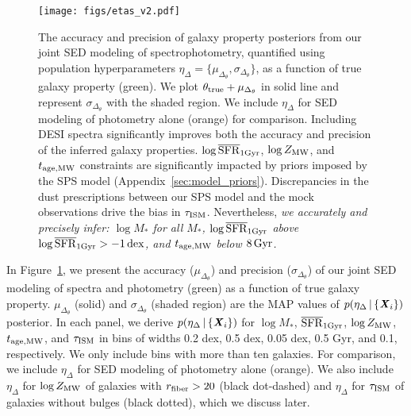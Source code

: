 \begin{figure}
\begin{center}
    \texttt{[image: figs/etas\_v2.pdf]}
    \caption{
        The accuracy and precision of galaxy property posteriors from our
        joint SED modeling of spectrophotometry, quantified using population
        hyperparameters $\eta_\Delta = \{\mu_{\Delta_{\theta}},
        \sigma_{\Delta_{\theta}}\}$, as a function of true galaxy property
        (green). 
        We plot $\theta_{\rm true} + \mu_{\Delta_{\theta}}$ in solid line and
        represent $\sigma_{\Delta_{\theta}}$ with the shaded region.
        We include $\eta_\Delta$ for SED modeling of photometry alone (orange)
        for comparison. 
        Including DESI spectra significantly improves both the accuracy and
        precision of the inferred galaxy properties. 
        $\log\overline{\rm SFR}_{\rm 1Gyr}$, $\log Z_{\rm MW}$, and $t_{\rm age, MW}$ constraints are
        significantly impacted by  priors imposed by the SPS model
        (Appendix~\ref{sec:model_priors}).
        Discrepancies in the dust prescriptions between our SPS model and the
        mock observations drive the bias in $\tau_{\rm ISM}$.
        Nevertheless, \emph{we accurately and precisely infer: $\log M_*$ for
        all $M_*$, $\log\overline{\rm SFR}_{\rm 1Gyr}$ above $\log\overline{\rm SFR}_{\rm 1Gyr} > -1\,{\rm dex}$, and 
        $t_{\rm age, MW}$ below $8\,{\rm Gyr}$.}
        } \label{fig:etas}
\end{center}
\end{figure}

In Figure~\ref{fig:etas}, we present the accuracy ($\mu_{\Delta_{\theta}}$) and
precision ($\sigma_{\Delta_{\theta}}$) of our joint SED modeling of spectra and
photometry (green) as a function of true galaxy property. 
$\mu_{\Delta_{\theta}}$ (solid) and $\sigma_{\Delta_{\theta}}$ (shaded region)
are the MAP values of $p(\eta_\Delta \,|\, \{{\textbf{\textit{X}}_i}\})$ posterior. 
In each panel, we derive $p(\eta_\Delta \,|\, \{{\textbf{\textit{X}}_i}\})$ for 
$\log M_*$, $\overline{\rm SFR}_{\rm 1Gyr}$, $\log Z_{\rm MW}$, $t_{\rm age, MW}$, and $\tau_{\rm ISM}$ in bins of
widths 0.2 dex, 0.5 dex, 0.05 dex, 0.5 Gyr, and 0.1, respectively. 
We only include bins with more than ten galaxies. 
For comparison, we include $\eta_\Delta$ for SED modeling of photometry alone
(orange).
We also include $\eta_\Delta$ for $\log Z_{\rm MW}$ of galaxies with $r_{\rm fiber} >
20$ (black dot-dashed) and $\eta_\Delta$ for $\tau_{\rm ISM}$ of galaxies
without bulges (black dotted), which we discuss later. 

